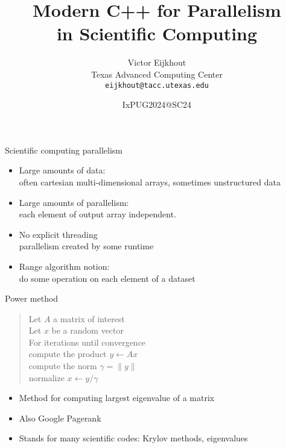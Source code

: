 \documentclass[10pt,t]{beamer}
\begin{document}


\author[Eijkhout]{Victor Eijkhout\\
  Texas Advanced Computing Center\\
  \texttt{eijkhout@tacc.utexas.edu}
}
\date{IxPUG2024@SC24}
\title[C++ Parallel]{Modern C++ for Parallelism\\ in Scientific Computing}
\maketitle

\begin{frame}{Scientific computing parallelism}
  \begin{itemize}
  \item Large amounts of data: \\
    often cartesian multi-dimensional arrays, sometimes unstructured data
  \item Large amounts of parallelism:\\
    each element of output array independent.
  \item No explicit threading\\
    parallelism created by some runtime
  \item Range algorithm notion:\\
    do some operation on each element of a dataset
  \end{itemize}
\end{frame}

\begin{frame}[containsverbatim]{Power method}
  \hbox{}
  \begin{quote}
    \begin{tabbing}
      Let $A$ a matrix of interest\\
      Let $x$ be a random vector\\
      For \=iterations until convergence\\
      \> compute the product $y\leftarrow Ax$\\
      \> compute the norm $\gamma=\| y \|$\\
      \> normalize $x\leftarrow y/\gamma$\\
    \end{tabbing}
  \end{quote}
  \begin{itemize}
  \item Method for computing largest eigenvalue of a matrix
  \item Also Google Pagerank
  \item Stands for many scientific codes: Krylov methods, eigenvalues
  \end{itemize}
\end{frame}
\end{document}
